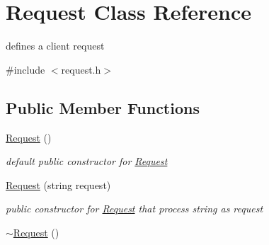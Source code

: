 \hypertarget{classRequest}{}\section{Request Class Reference}
\label{classRequest}


defines a client request  




{\ttfamily \#include $<$request.\+h$>$}

\subsection*{Public Member Functions}
\begin{DoxyCompactItemize}
\item 
\hyperlink{classRequest_afaf8d8928de7ffff8a3767589489bd33}{Request} ()\hypertarget{classRequest_afaf8d8928de7ffff8a3767589489bd33}{}\label{classRequest_afaf8d8928de7ffff8a3767589489bd33}

\begin{DoxyCompactList}\small\item\em default public constructor for \hyperlink{classRequest}{Request} \end{DoxyCompactList}\item 
\hyperlink{classRequest_a3b25fd1c24befd84e55ec36d012dfd29}{Request} (string request)
\begin{DoxyCompactList}\small\item\em public constructor for \hyperlink{classRequest}{Request} that process string as request \end{DoxyCompactList}\item 
\hyperlink{classRequest_a4d57c725686701f773eb3630630a7ea2}{$\sim$\+Request} ()\hypertarget{classRequest_a4d57c725686701f773eb3630630a7ea2}{}\label{classRequest_a4d57c725686701f773eb3630630a7ea2}


\end{DoxyCompactItemize}
